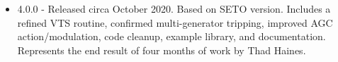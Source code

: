 \begin{itemize}

 em
\item 4.0.0 - Released circa October 2020. Based on SETO version. 
Includes a refined VTS routine, confirmed multi-generator tripping, improved AGC action/modulation, code cleanup, example library, and documentation.
Represents the end result of four months of work by Thad Haines.
\end{itemize}